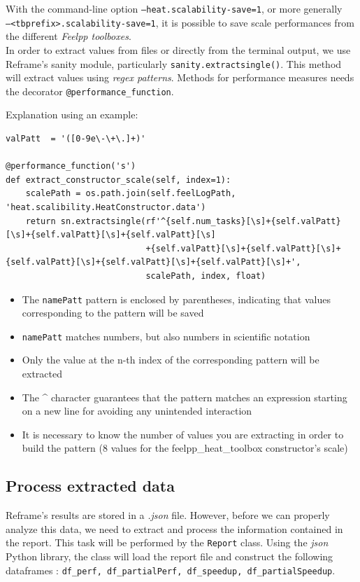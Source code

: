 \documentclass[12pt]{article}
\begin{document}
With the command-line option \small{\texttt{--heat.scalability-save=1}}, or more generally \\ \small{\texttt{--<tbprefix>.scalability-save=1}}, it is possible to save scale performances from the different \textit{Feelpp toolboxes}. \\
In order to extract values from files or directly from the terminal output, we use Reframe's sanity module, particularly \texttt{sanity.extractsingle()}.
This method will extract values using \textit{regex patterns}. Methods for performance measures needs the decorator \small{\texttt{@performance\_function}}.

Explanation using an example:
\begin{scriptsize}
\begin{verbatim}
valPatt  = '([0-9e\-\+\.]+)'

@performance_function('s')
def extract_constructor_scale(self, index=1):
    scalePath = os.path.join(self.feelLogPath, 'heat.scalibility.HeatConstructor.data')
    return sn.extractsingle(rf'^{self.num_tasks}[\s]+{self.valPatt}[\s]+{self.valPatt}[\s]+{self.valPatt}[\s]
                            +{self.valPatt}[\s]+{self.valPatt}[\s]+{self.valPatt}[\s]+{self.valPatt}[\s]+{self.valPatt}[\s]+',
                            scalePath, index, float)
\end{verbatim}
\end{scriptsize}

\begin{itemize}
    \item The \small{\texttt{namePatt}} pattern is enclosed by parentheses, indicating that values corresponding to the pattern will be saved
    \item \small{\texttt{namePatt}} matches numbers, but also numbers in scientific notation
    \item Only the value at the n-th index of the corresponding pattern will be extracted
    \item The \^{} character guarantees that the pattern matches an expression starting on a new line for avoiding any unintended interaction
    \item It is necessary to know the number of values you are extracting in order to build the pattern (8 values for the feelpp\_heat\_toolbox constructor's scale)
\end{itemize}


\subsection{Process extracted data}
Reframe's results are stored in a \textit{.json} file. However, before we can properly analyze this data, we need to extract and process the information contained in the report.
This task will be performed by the \small{\texttt{Report}} class. Using the \textit{json} Python library, the class will load the report file and construct the following dataframes :
\texttt{df\_perf, df\_partialPerf, df\_speedup, df\_partialSpeedup}.
\end{document}
